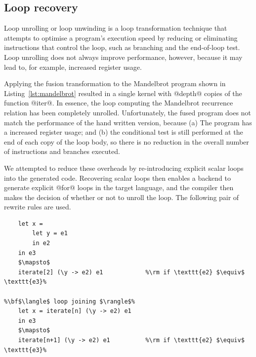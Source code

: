

\subsection{Loop recovery}

Loop unrolling or loop unwinding is a loop transformation technique that
attempts to optimise a program's execution speed by reducing or eliminating
instructions that control the loop, such as branching and the end-of-loop test.
Loop unrolling does not always improve performance, however, because it may lead
to, for example, increased register usage.

Applying the fusion transformation to the Mandelbrot program shown in
Listing~\ref{lst:mandelbrot} resulted in a single kernel with @depth@ copies of
the function @iter@. In essence, the loop computing the Mandelbrot recurrence
relation has been completely unrolled. Unfortunately, the fused program does not
match the performance of the hand written version, because (a)
The program has a increased register usage; and (b) the conditional test is
still performed at the end of each copy of the loop body, so there is no
reduction in the overall number of instructions and branches executed.

We attempted to reduce these overheads by re-introducing explicit scalar loops
into the generated code. Recovering scalar loops then enables a backend to
generate explicit @for@ loops in the target language, and the compiler then
makes the decision of whether or not to unroll the loop. The following pair of
rewrite rules are used.
%
\begin{lstlisting}[style=Haskell,numbers=none,mathescape]
%\bf$\langle$ loop introduction $\rangle$%
    let x =
        let y = e1
        in e2
    in e3
    $\mapsto$
    iterate[2] (\y -> e2) e1            %\rm if \texttt{e2} $\equiv$ \texttt{e3}%

%\bf$\langle$ loop joining $\rangle$%
    let x = iterate[n] (\y -> e2) e1
    in e3
    $\mapsto$
    iterate[n+1] (\y -> e2) e1          %\rm if \texttt{e2} $\equiv$ \texttt{e3}%
\end{lstlisting}

